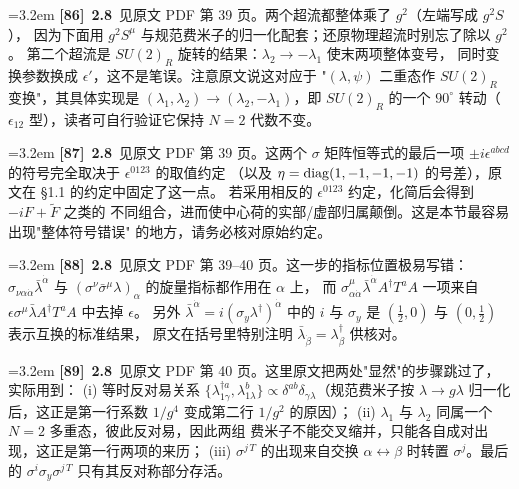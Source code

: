 \par
\par\medskip\noindent\hangindent=3.2em \textbf{[86]}~\textbf{2.8}~见原文 PDF 第 39 页。两个超流都整体乘了 $g^2$（左端写成 $g^2S$）， 因为下面用 $g^2S^\mu$ 与规范费米子的归一化配套；还原物理超流时别忘了除以 $g^2$。 第二个超流是 $SU(2)_R$ 旋转的结果：$\lambda_2\to-\lambda_1$ 使末两项整体变号， 同时变换参数换成 $\epsilon'$，这不是笔误。注意原文说这对应于 "$(\lambda,\psi)$ 二重态作 $SU(2)_R$ 变换"，其具体实现是 $(\lambda_1,\lambda_2)\to(\lambda_2,-\lambda_1)$，即 $SU(2)_R$ 的一个 $90^\circ$ 转动（$\epsilon_{12}$ 型），读者可自行验证它保持 $N=2$ 代数不变。
\par
\par\medskip\noindent\hangindent=3.2em \textbf{[87]}~\textbf{2.8}~见原文 PDF 第 39 页。这两个 $\sigma$ 矩阵恒等式的最后一项 $\pm i\epsilon^{abcd}$ 的符号完全取决于 $\epsilon^{0123}$ 的取值约定 （以及 $\eta={\rm diag}(1,-1,-1,-1)$ 的号差），原文在 §1.1 的约定中固定了这一点。 若采用相反的 $\epsilon^{0123}$ 约定，化简后会得到 $-iF+\widetilde F$ 之类的 不同组合，进而使中心荷的实部/虚部归属颠倒。这是本节最容易出现"整体符号错误" 的地方，请务必核对原始约定。
\par
\par\medskip\noindent\hangindent=3.2em \textbf{[88]}~\textbf{2.8}~见原文 PDF 第 39--40 页。这一步的指标位置极易写错： $\sigma_{\nu\alpha\dot\alpha}\bar\lambda^{\dot\alpha}$ 与 $(\sigma^\nu\bar\sigma^\mu\lambda)_\alpha$ 的旋量指标都作用在 $\alpha$ 上， 而 $\sigma^\mu_{\alpha\dot\alpha}\bar\lambda^{\dot\alpha}A^\dagger T^aA$ 一项来自 $\epsilon\sigma^\mu\bar\lambda A^\dagger T^aA$ 中去掉 $\epsilon$。 另外 $\bar\lambda^{\dot\alpha}=i(\sigma_y\lambda^\dagger)^{\dot\alpha}$ 中的 $i$ 与 $\sigma_y$ 是 $(\frac12,0)$ 与 $(0,\frac12)$ 表示互换的标准结果， 原文在括号里特别注明 $\bar\lambda_{\dot\beta}=\lambda^\dagger_\beta$ 供核对。
\par
\par\medskip\noindent\hangindent=3.2em \textbf{[89]}~\textbf{2.8}~见原文 PDF 第 40 页。这里原文把两处"显然"的步骤跳过了，实际用到： (i) 等时反对易关系 $\{\lambda^{\dagger a}_{1\gamma},\lambda^b_{1\lambda}\} \propto\delta^{ab}\delta_{\gamma\lambda}$（规范费米子按 $\lambda\to g\lambda$ 归一化后，这正是第一行系数 $1/g^4$ 变成第二行 $1/g^2$ 的原因）； (ii) $\lambda_1$ 与 $\lambda_2$ 同属一个 $N=2$ 多重态，彼此反对易，因此两组 费米子不能交叉缩并，只能各自成对出现，这正是第一行两项的来历； (iii) $\sigma^{j\,T}$ 的出现来自交换 $\alpha\leftrightarrow\beta$ 时转置 $\sigma^j$。最后的 $\sigma^i\sigma_y\sigma^{j\,T}$ 只有其反对称部分存活。
